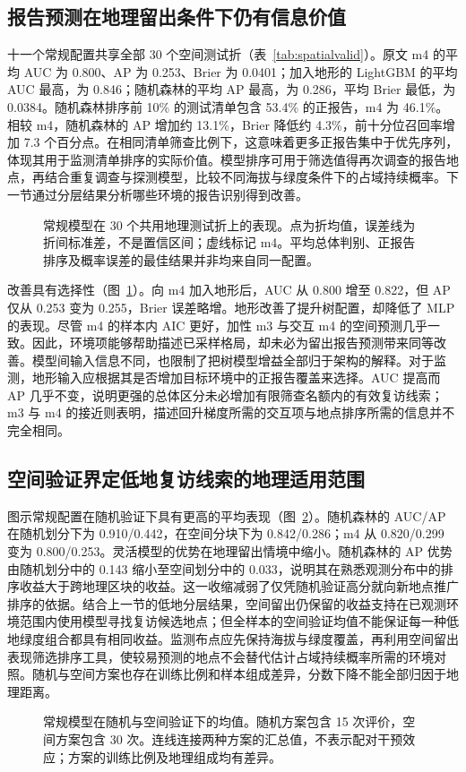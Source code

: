 \subsection{报告预测在地理留出条件下仍有信息价值}
十一个常规配置共享全部 30 个空间测试折（表~\ref{tab:spatialvalid}）。原文 m4 的平均 AUC 为 0.800、AP 为 0.253、Brier 为 0.0401；加入地形的 LightGBM 的平均 AUC 最高，为 0.846；随机森林的平均 AP 最高，为 0.286，平均 Brier 最低，为 0.0384。随机森林排序前 10\% 的测试清单包含 53.4\% 的正报告，m4 为 46.1\%。相较 m4，随机森林的 AP 增加约 13.1\%，Brier 降低约 4.3\%，前十分位召回率增加 7.3 个百分点。在相同清单筛查比例下，这意味着更多正报告集中于优先序列，体现其用于监测清单排序的实际价值。模型排序可用于筛选值得再次调查的报告地点，再结合重复调查与探测模型，比较不同海拔与绿度条件下的占域持续概率。下一节通过分层结果分析哪些环境的报告识别得到改善。
\begin{figure}[htbp]\centering
{}
\caption{常规模型在 30 个共用地理测试折上的表现。点为折均值，误差线为折间标准差，不是置信区间；虚线标记 m4。平均总体判别、正报告排序及概率误差的最佳结果并非均来自同一配置。}\label{fig:validbench}
\end{figure}

改善具有选择性（图~\ref{fig:validbench}）。向 m4 加入地形后，AUC 从 0.800 增至 0.822，但 AP 仅从 0.253 变为 0.255，Brier 误差略增。地形改善了提升树配置，却降低了 MLP 的表现。尽管 m4 的样本内 AIC 更好，加性 m3 与交互 m4 的空间预测几乎一致。因此，环境项能够帮助描述已采样格局，却未必为留出报告预测带来同等改善。模型间输入信息不同，也限制了把树模型增益全部归于架构的解释。对于监测，地形输入应根据其是否增加目标环境中的正报告覆盖来选择。AUC 提高而 AP 几乎不变，说明更强的总体区分未必增加有限筛查名额内的有效复访线索；m3 与 m4 的接近则表明，描述回升梯度所需的交互项与地点排序所需的信息并不完全相同。



\subsection{空间验证界定低地复访线索的地理适用范围}
图示常规配置在随机验证下具有更高的平均表现（图~\ref{fig:protocolvalid}）。随机森林的 AUC/AP 在随机划分下为 0.910/0.442，在空间分块下为 0.842/0.286；m4 从 0.820/0.299 变为 0.800/0.253。灵活模型的优势在地理留出情境中缩小。随机森林的 AP 优势由随机划分中的 0.143 缩小至空间划分中的 0.033，说明其在熟悉观测分布中的排序收益大于跨地理区块的收益。这一收缩减弱了仅凭随机验证高分就向新地点推广排序的依据。结合上一节的低地分层结果，空间留出仍保留的收益支持在已观测环境范围内使用模型寻找复访候选地点；但全样本的空间验证均值不能保证每一种低地绿度组合都具有相同收益。监测布点应先保持海拔与绿度覆盖，再利用空间留出表现筛选排序工具，使较易预测的地点不会替代估计占域持续概率所需的环境对照。随机与空间方案也存在训练比例和样本组成差异，分数下降不能全部归因于地理距离。
\begin{figure}[htbp]\centering
{}
\caption{常规模型在随机与空间验证下的均值。随机方案包含 15 次评价，空间方案包含 30 次。连线连接两种方案的汇总值，不表示配对干预效应；方案的训练比例及地理组成均有差异。}\label{fig:protocolvalid}
\end{figure}

\FloatBarrier



